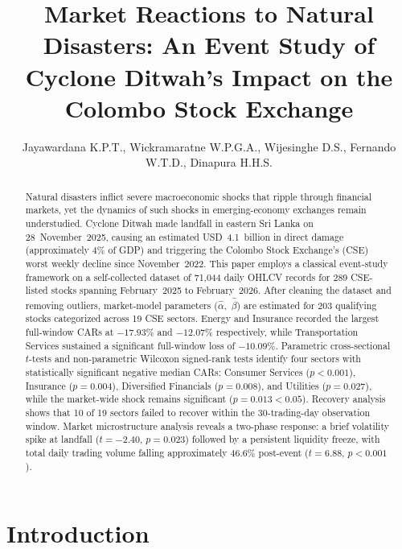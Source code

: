 \documentclass[sigconf, nonacm]{acmart}
\title{Market Reactions to Natural Disasters: An Event Study of\\
       Cyclone Ditwah's Impact on the Colombo Stock Exchange}
\author{
Jayawardana K.P.T.,
Wickramaratne W.P.G.A.,
Wijesinghe D.S.,
Fernando W.T.D.,
Dinapura H.H.S.
}
\affiliation{%
  \institution{Department of Computer Science \& Engineering, University of Moratuwa}
  \city{Moratuwa}
  \country{Sri Lanka}
}
\begin{document}
\begin{abstract}
Natural disasters inflict severe macroeconomic shocks that ripple through
financial markets, yet the dynamics of such shocks in emerging-economy
exchanges remain understudied. Cyclone Ditwah made landfall in eastern
Sri Lanka on 28~November~2025, causing an estimated USD~4.1~billion in
direct damage (approximately 4\% of GDP) and triggering the Colombo Stock
Exchange's (CSE) worst weekly decline since November~2022. This paper
employs a classical event-study framework on a self-collected dataset of
71,044 daily OHLCV records for 289 CSE-listed stocks spanning
February~2025 to February~2026. After cleaning the dataset and removing outliers, market-model parameters
($\hat{\alpha}$,~$\hat{\beta}$) are estimated for 203 qualifying stocks categorized across 19 CSE sectors. Energy and Insurance
recorded the largest full-window CARs at $-17.93\%$ and $-12.07\%$
respectively, while Transportation Services sustained a significant full-window
loss of $-10.09\%$. Parametric cross-sectional $t$-tests and non-parametric
Wilcoxon signed-rank tests identify four sectors with statistically
significant negative median CARs: Consumer Services ($p < 0.001$), Insurance 
($p=0.004$), Diversified Financials ($p=0.008$), and Utilities ($p=0.027$), while the
market-wide shock remains significant ($p = 0.013 < 0.05$). Recovery analysis
shows that 10 of 19 sectors failed to recover within the 30-trading-day
observation window. Market microstructure analysis reveals a two-phase
response: a brief volatility spike at landfall ($t=-2.40$, $p=0.023$)
followed by a persistent liquidity freeze, with total daily trading volume
falling approximately 46.6\% post-event ($t=6.88$, $p<0.001$).
\end{abstract}


\maketitle

\section{Introduction}
\end{document}
